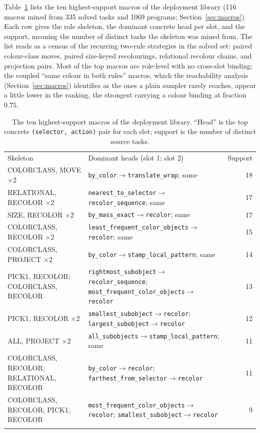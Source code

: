 Table~\ref{tab:app-macros} lists the ten highest-support macros of the deployment library
(116 macros mined from 335 solved tasks and 1069 programs;
Section~\ref{sec:macros}). Each row gives the role skeleton, the dominant concrete
head per slot, and the support, meaning the number of distinct tasks the skeleton was mined
from. The list reads as a census of the recurring two-rule strategies in the solved set:
paired colour-class moves, paired size-keyed recolourings, relational recolour chains, and
projection pairs. Most of the top macros are role-level with no cross-slot binding; the
coupled ``same colour in both rules'' macros, which the reachability analysis
(Section~\ref{sec:macros}) identifies as the ones a plain sampler rarely
reaches, appear a little lower in the ranking, the strongest carrying a colour binding at
fraction $0.75$.

\begin{table}[htbp]
\centering
\caption{The ten highest-support macros of the deployment library. ``Head'' is the
top concrete \texttt{(selector, action)} pair for each slot; support is the number of
distinct source tasks.}
\label{tab:app-macros}
\footnotesize
\begin{tabular}{p{2.0cm}p{7.4cm}r}
\hline\noalign{\smallskip}
Skeleton & Dominant heads (slot 1; slot 2) & Support \\
\noalign{\smallskip}\hline\noalign{\smallskip}
COLORCLASS, MOVE $\times2$ & \texttt{by\_color$\to$translate\_wrap}; same & 18 \\
RELATIONAL, RECOLOR $\times2$ & \texttt{nearest\_to\_selector$\to$recolor\_sequence}; same & 17 \\
SIZE, RECOLOR $\times2$ & \texttt{by\_mass\_exact$\to$recolor}; same & 17 \\
COLORCLASS, RECOLOR $\times2$ & \texttt{least\_frequent\_color\_objects$\to$recolor}; same & 15 \\
COLORCLASS, PROJECT $\times2$ & \texttt{by\_color$\to$stamp\_local\_pattern}; same & 14 \\
PICK1, RECOLOR; COLORCLASS, RECOLOR & \texttt{rightmost\_subobject$\to$recolor\_sequence}; \texttt{most\_frequent\_color\_objects$\to$recolor} & 13 \\
PICK1, RECOLOR $\times2$ & \texttt{smallest\_subobject$\to$recolor}; \texttt{largest\_subobject$\to$recolor} & 12 \\
ALL, PROJECT $\times2$ & \texttt{all\_subobjects$\to$stamp\_local\_pattern}; same & 11 \\
COLORCLASS, RECOLOR; RELATIONAL, RECOLOR & \texttt{by\_color$\to$recolor}; \texttt{farthest\_from\_selector$\to$recolor} & 11 \\
COLORCLASS, RECOLOR; PICK1, RECOLOR & \texttt{most\_frequent\_color\_objects$\to$recolor}; \texttt{smallest\_subobject$\to$recolor} & 9 \\
\noalign{\smallskip}\hline
\end{tabular}
\end{table}

